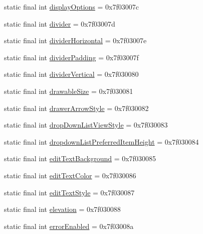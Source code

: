 \begin{DoxyCompactItemize}
static final int \mbox{\hyperlink{classandroid_1_1support_1_1design_1_1_r_1_1attr_a93c1aae4701355ebdf9580afa1586c65}{display\+Options}} = 0x7f03007c
\item 
static final int \mbox{\hyperlink{classandroid_1_1support_1_1design_1_1_r_1_1attr_ae104d6437ed6e2bcdf6d19e7512c698f}{divider}} = 0x7f03007d
\item 
static final int \mbox{\hyperlink{classandroid_1_1support_1_1design_1_1_r_1_1attr_a5c3d002a620e4a91207c532d94baff2e}{divider\+Horizontal}} = 0x7f03007e
\item 
static final int \mbox{\hyperlink{classandroid_1_1support_1_1design_1_1_r_1_1attr_aa232cfdd1a85b48a7020e02ae3feaaca}{divider\+Padding}} = 0x7f03007f
\item 
static final int \mbox{\hyperlink{classandroid_1_1support_1_1design_1_1_r_1_1attr_ad9bff20984b9b305919aaf3b1a699315}{divider\+Vertical}} = 0x7f030080
\item 
static final int \mbox{\hyperlink{classandroid_1_1support_1_1design_1_1_r_1_1attr_a752d7489bf25759f26da0de7051c6d6c}{drawable\+Size}} = 0x7f030081
\item 
static final int \mbox{\hyperlink{classandroid_1_1support_1_1design_1_1_r_1_1attr_a067fc22595374f6cf79df43697f707d0}{drawer\+Arrow\+Style}} = 0x7f030082
\item 
static final int \mbox{\hyperlink{classandroid_1_1support_1_1design_1_1_r_1_1attr_aecae50e199b147d3412c64228e7ffbfa}{drop\+Down\+List\+View\+Style}} = 0x7f030083
\item 
static final int \mbox{\hyperlink{classandroid_1_1support_1_1design_1_1_r_1_1attr_a9771b11e6d5d4f3ac5339bfa4afb5bdf}{dropdown\+List\+Preferred\+Item\+Height}} = 0x7f030084
\item 
static final int \mbox{\hyperlink{classandroid_1_1support_1_1design_1_1_r_1_1attr_ae5151ecdcfbdc46e6e424c79b60548ee}{edit\+Text\+Background}} = 0x7f030085
\item 
static final int \mbox{\hyperlink{classandroid_1_1support_1_1design_1_1_r_1_1attr_ae5bffd7d1a0defcc8af0a2d675908267}{edit\+Text\+Color}} = 0x7f030086
\item 
static final int \mbox{\hyperlink{classandroid_1_1support_1_1design_1_1_r_1_1attr_ac21901da73b034db7da8b6598b5954a5}{edit\+Text\+Style}} = 0x7f030087
\item 
static final int \mbox{\hyperlink{classandroid_1_1support_1_1design_1_1_r_1_1attr_a32597814963a4ec5dd120c66e7ac7f15}{elevation}} = 0x7f030088
\item 
static final int \mbox{\hyperlink{classandroid_1_1support_1_1design_1_1_r_1_1attr_a33177626e9eac6ee0f334023420ed888}{error\+Enabled}} = 0x7f03008a

\end{DoxyCompactItemize}
